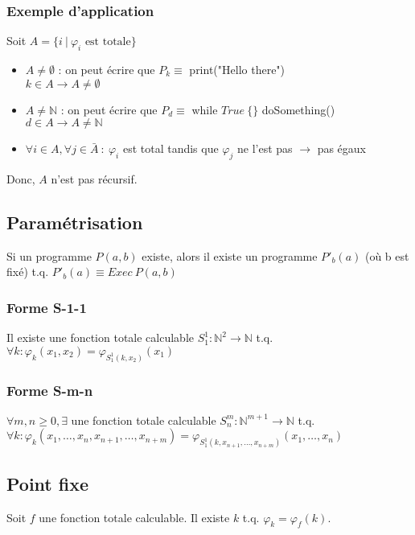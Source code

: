 \subsubsection{Exemple d'application}

Soit $A = \{i \ |\ \varphi_i \text{ est totale}\}$
\begin{itemize}
\item $A \neq \emptyset$ : on peut écrire que $P_k \equiv$ print("Hello there")\\
	$k \in A \rightarrow A \neq \emptyset$
\item $A \neq \mathbb{N}$ : on peut écrire que $P_d \equiv$ while $True \ \{\}$ doSomething()
	$d \in A \rightarrow A \neq \mathbb{N}$
\item $\forall i \in A, \forall j \in \bar{A}\ :\ \varphi_i$ est total tandis que $\varphi_j$ ne l'est pas $\rightarrow$ pas égaux
\end{itemize}
Donc, $A$ n'est pas récursif.

\subsection{Paramétrisation}

Si un programme $P(a,b)$ existe, alors il existe un programme $P'_b(a)$ (où b est fixé) t.q. $P'_b(a) \equiv Exec \ P(a,b)$

\subsubsection{Forme S-1-1}

Il existe une fonction totale calculable $S^1_1 : \mathbb{N}^2 \rightarrow \mathbb{N}$ t.q. $\forall k : \varphi_k(x_1, x_2) = \varphi_{S^1_1(k,x_2)}(x_1)$

\subsubsection{Forme S-m-n}

$\forall m,n \geq 0, \exists$ une fonction totale calculable $S^m_n : \mathbb{N}^{m+1} \rightarrow \mathbb{N}$ t.q. $\forall k : \varphi_k(x_1, \ldots, x_n, x_{n+1}, \ldots, x_{n+m}) = \varphi_{S^1_1(k,x_{n+1}, \ldots, x_{n+m})}(x_1, \ldots, x_n)$

\newpage
\subsection{Point fixe}

Soit $f$ une fonction totale calculable. Il existe $k$ t.q. $\varphi_k = \varphi_f(k)$.

